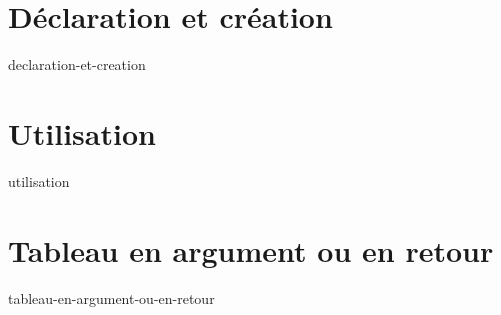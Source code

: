 \section{Déclaration et création}\label{sec:declaration-et-creation}
    {declaration-et-creation}

\section{Utilisation}
    {utilisation}

\section{Tableau en argument ou en retour}\label{sec:tableau-en-argument-ou-en-retour}
    {tableau-en-argument-ou-en-retour}